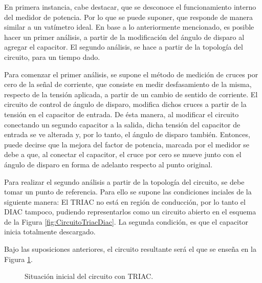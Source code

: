 En primera instancia, cabe destacar, que se desconoce el funcionamiento interno del medidor de potencia.
Por lo que se puede suponer, que responde de manera similar a un vatímetro ideal. 
En base a lo anteriormente mencionado, es posible hacer un primer análisis, a partir 
de la modificación del ángulo de disparo al agregar el capacitor. El segundo análisis, 
se hace a partir de la topología del circuito, para un tiempo dado.

Para comenzar el primer análisis, se supone el método de medición de cruces 
por cero de la señal de corriente, que consiste en medir desfasamiento de la misma, 
respecto de la tensión aplicada, a partir de un cambio de sentido de corriente. 
El circuito de control de ángulo de disparo, modifica dichos cruces a partir de la 
tensión en el capacitor de entrada. De ésta manera, al modificar el circuito conectando 
un segundo capacitor a la salida, dicha tensión del capacitor de entrada se ve alterada y, por 
lo tanto, el ángulo de disparo también. Entonces, puede decirse que la mejora del factor 
de potencia, marcada por el medidor se debe a que, al conectar el capacitor, el cruce por 
cero se mueve junto con el ángulo de disparo en forma de adelanto respecto al punto original.

Para realizar el segundo análisis a partir de la topología del circuito, se debe 
tomar un punto de referencia. Para ello se supone las condiciones 
inciales de la siguiente manera: El TRIAC no está en región de conducción, por 
lo tanto el DIAC tampoco, pudiendo representarlos como 
un circuito abierto en el esquema de la Figura \ref{fig:CircuitoTriacDiac}. La 
segunda condición, es que el capacitor inicia totalmente descargado.

Bajo las suposiciones anteriores, el circuito resultante será el que se enseña 
en la Figura \ref{fig:ConclusionRCTriac}.

\begin{figure}[H]
  \centering
  \caption{Situación inicial del circuito con TRIAC.}
  \label{fig:ConclusionRCTriac}
\end{figure}

